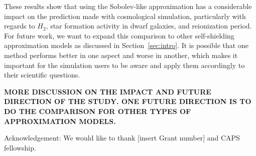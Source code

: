 \documentclass[linenumbers, twocolumn]{aastex631}
\begin{document}
These results show that using the Sobolev-like approximation has a considerable impact on the prediction made with cosmological simulation, particularly with regards to $H_{2}$, star formation activity in dwarf galaxies, and reionization period. For future work, we want to expand this comparison to other self-shielding approximation models as discussed in Section~\ref{sec:intro}. It is possible that one method performs better in one aspect and worse in another, which makes it important for the simulation users to be aware and apply them accordingly to their scientific questions.

\textbf{MORE DISCUSSION ON THE IMPACT AND FUTURE DIRECTION OF THE STUDY. ONE FUTURE DIRECTION IS TO DO THE COMPARISON FOR OTHER TYPES OF APPROXIMATION MODELS.}

\begin{acknowledgments}
Acknowledgement: We would like to thank [insert Grant number] and CAPS fellowship. 
\end{acknowledgments}

%

\vspace{5mm}

\end{document}
